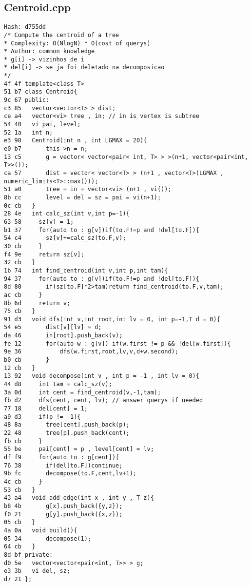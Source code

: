 \documentclass[11pt, a4paper, twoside]{article}
\begin{document}
\subsection{Centroid.cpp}
\begin{lstlisting}
Hash: d755dd
/* Compute the centroid of a tree
* Complexity: O(NlogN) * O(cost of querys)
* Author: common knowledge
* g[i] -> vizinhos de i
* del[i] -> se ja foi deletado na decomposicao
*/
4f 4f template<class T>
51 b7 class Centroid{
9c 67 public:
c3 85 	vector<vector<T> > dist;
ce a4 	vector<vi> tree , in; // in is vertex is subtree 
54 40 	vi pai, level;
52 1a 	int n;
e3 98 	Centroid(int n , int LGMAX = 20){
e0 b7 		this->n = n;
13 c5 		g = vector< vector<pair< int, T> > >(n+1, vector<pair<int, T>>());
ca 57 		dist = vector< vector<T> > (n+1 , vector<T>(LGMAX , numeric_limits<T>::max()));
51 a0 		tree = in = vector<vi> (n+1 , vi());
8b cc 		level = del = sz = pai = vi(n+1);
0c cb 	}
28 4e 	int calc_sz(int v,int p=-1){
63 58 	  sz[v] = 1;
b1 37 	  for(auto to : g[v])if(to.F!=p and !del[to.F]){
54 c4 	    sz[v]+=calc_sz(to.F,v);
30 cb 	  }
f4 9e 	  return sz[v];
32 cb 	}
1b 74 	int find_centroid(int v,int p,int tam){
94 37 	  for(auto to : g[v])if(to.F!=p and !del[to.F]){
8d 80 	    if(sz[to.F]*2>tam)return find_centroid(to.F,v,tam);
ac cb 	  }
8b 6d 	  return v;
75 cb 	}
91 d3 	void dfs(int v,int root,int lv = 0, int p=-1,T d = 0){
54 e5 		dist[v][lv] = d;
da 46 		in[root].push_back(v);
fe 12 		for(auto w : g[v]) if(w.first != p && !del[w.first]){
9e 36 			dfs(w.first,root,lv,v,d+w.second);
b0 cb 		}
12 cb 	}
13 92 	void decompose(int v , int p = -1 , int lv = 0){
44 d8 	  int tam = calc_sz(v);
3a 0d 	  int cent = find_centroid(v,-1,tam); 
fb d2 	  dfs(cent, cent, lv); // answer querys if needed
77 18 	  del[cent] = 1;
a9 d3 	  if(p != -1){
48 8a 	  	tree[cent].push_back(p);
22 48 	  	tree[p].push_back(cent);
fb cb 	  }
55 be 	  pai[cent] = p , level[cent] = lv;
df f9 	  for(auto to : g[cent]){
76 38 	    if(del[to.F])continue;
9b fc 	    decompose(to.F,cent,lv+1);
4c cb 	  }
53 cb 	}	
43 a4 	void add_edge(int x , int y , T z){
b8 4b 		g[x].push_back({y,z});
f0 21 		g[y].push_back({x,z});
05 cb 	}
4a 0a 	void build(){
05 34 		decompose(1);
64 cb 	}
8d bf private:
d0 5e 	vector<vector<pair<int, T>> > g;
e3 3b 	vi del, sz;
d7 21 };
\end{lstlisting}
\end{document}

